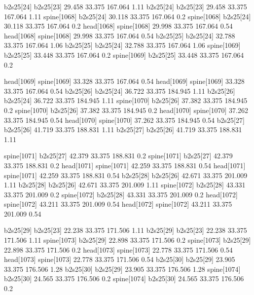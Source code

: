 b2s25[24]    b2s25[23]    29.458    33.375    167.064    1.11
b2s25[24]    b2s25[23]    29.458    33.375    167.064    1.11
spine[1068]    b2s25[24]    30.118    33.375    167.064    0.2
spine[1068]    b2s25[24]    30.118    33.375    167.064    0.2
head[1068]    spine[1068]    29.998    33.375    167.064    0.54
head[1068]    spine[1068]    29.998    33.375    167.064    0.54
b2s25[25]    b2s25[24]    32.788    33.375    167.064    1.06
b2s25[25]    b2s25[24]    32.788    33.375    167.064    1.06
spine[1069]    b2s25[25]    33.448    33.375    167.064    0.2
spine[1069]    b2s25[25]    33.448    33.375    167.064    0.2


head[1069]    spine[1069]    33.328    33.375    167.064    0.54
head[1069]    spine[1069]    33.328    33.375    167.064    0.54
b2s25[26]    b2s25[24]    36.722    33.375    184.945    1.11
b2s25[26]    b2s25[24]    36.722    33.375    184.945    1.11
spine[1070]    b2s25[26]    37.382    33.375    184.945    0.2
spine[1070]    b2s25[26]    37.382    33.375    184.945    0.2
head[1070]    spine[1070]    37.262    33.375    184.945    0.54
head[1070]    spine[1070]    37.262    33.375    184.945    0.54
b2s25[27]    b2s25[26]    41.719    33.375    188.831    1.11
b2s25[27]    b2s25[26]    41.719    33.375    188.831    1.11


spine[1071]    b2s25[27]    42.379    33.375    188.831    0.2
spine[1071]    b2s25[27]    42.379    33.375    188.831    0.2
head[1071]    spine[1071]    42.259    33.375    188.831    0.54
head[1071]    spine[1071]    42.259    33.375    188.831    0.54
b2s25[28]    b2s25[26]    42.671    33.375    201.009    1.11
b2s25[28]    b2s25[26]    42.671    33.375    201.009    1.11
spine[1072]    b2s25[28]    43.331    33.375    201.009    0.2
spine[1072]    b2s25[28]    43.331    33.375    201.009    0.2
head[1072]    spine[1072]    43.211    33.375    201.009    0.54
head[1072]    spine[1072]    43.211    33.375    201.009    0.54


b2s25[29]    b2s25[23]    22.238    33.375    171.506    1.11
b2s25[29]    b2s25[23]    22.238    33.375    171.506    1.11
spine[1073]    b2s25[29]    22.898    33.375    171.506    0.2
spine[1073]    b2s25[29]    22.898    33.375    171.506    0.2
head[1073]    spine[1073]    22.778    33.375    171.506    0.54
head[1073]    spine[1073]    22.778    33.375    171.506    0.54
b2s25[30]    b2s25[29]    23.905    33.375    176.506    1.28
b2s25[30]    b2s25[29]    23.905    33.375    176.506    1.28
spine[1074]    b2s25[30]    24.565    33.375    176.506    0.2
spine[1074]    b2s25[30]    24.565    33.375    176.506    0.2



